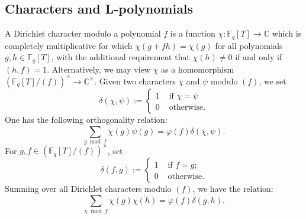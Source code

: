 \documentclass[table]{amsart}
\newcommand{\F}{\mathbb{F}}
\numberwithin{equation}{section}
\begin{document}
\subsection{Characters and L-polynomials}
\par A Dirichlet character modulo a polynomial \( f \) is a function \( \chi: \mathbb{F}_q[T] \to \mathbb{C} \) which is completely multiplicative for which \( \chi(g + fh) = \chi(g) \) for all polynomials \( g, h \in \mathbb{F}_q[T] \), with the additional requirement that \( \chi(h) \neq 0\) if and only if \( (h, f) = 1 \). Alternatively, we may view $\chi$ as a homomorphism $\left(\F_q[T]/(f)\right)^\times \rightarrow \mathbb{C}^\times$. Given two characters $\chi$ and $\psi$ modulo $(f)$, we set 
\[\delta(\chi, \psi):=\begin{cases}
    1 & \text{ if } \chi=\psi\\
    0 & \text{ otherwise}.
\end{cases}\]
One has the following orthogonality relation:
\begin{equation}\label{orthogonalityreln}
\sum_{g \bmod f} \chi(g) \overline{\psi(g)} = \varphi(f) \delta(\chi, \psi).
\end{equation}
For $g,f\in \left(\F_q[T]/(f)\right)^\times$, set 
\[\delta(f, g):=\begin{cases}
    1 & \text{ if } f=g;\\
    0 & \text{ otherwise.}
    \end{cases}\]
Summing over all Dirichlet characters modulo $(f)$, we have the relation:
\begin{equation}\label{orthogonality reln 2}
\sum_{\chi \bmod f} \chi(g) \overline{\chi(h)} = \varphi(f) \delta(g, h).
\end{equation}
\end{document}
